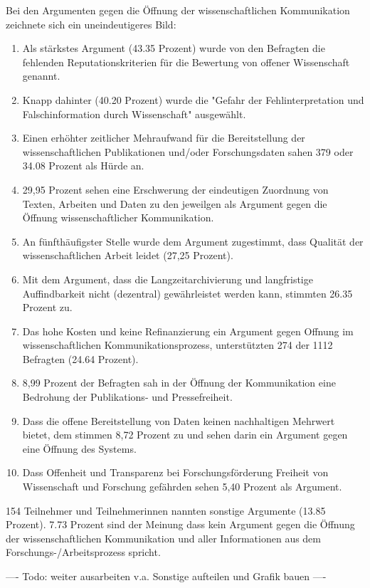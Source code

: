 Bei den Argumenten gegen die Öffnung der wissenschaftlichen Kommunikation zeichnete sich ein uneindeutigeres Bild:
\begin{enumerate}
\item Als stärkstes Argument (43.35 Prozent) wurde von den Befragten die fehlenden Reputationskriterien für die Bewertung von offener Wissenschaft genannt.   
\item Knapp dahinter (40.20 Prozent) wurde die "Gefahr der Fehlinterpretation und Falschinformation durch Wissenschaft" ausgewählt.
\item Einen erhöhter zeitlicher Mehraufwand für die Bereitstellung der wissenschaftlichen Publikationen und/oder Forschungsdaten sahen 379 oder 34.08 Prozent als Hürde an.
\item 29,95 Prozent sehen eine Erschwerung der eindeutigen Zuordnung von Texten, Arbeiten und Daten zu den jeweilgen als Argument gegen die Öffnung wissenschaftlicher Kommunikation.
\item  An fünfthäufigster Stelle wurde dem Argument zugestimmt, dass Qualität der wissenschaftlichen Arbeit leidet (27,25 Prozent).
\item Mit dem Argument, dass die Langzeitarchivierung und langfristige Auffindbarkeit nicht (dezentral) gewährleistet werden kann, stimmten 26.35 Prozent zu.
\item Das hohe Kosten und keine Refinanzierung ein Argument gegen Offnung im wissenschaftlichen Kommunikationsprozess, unterstützten 274 der 1112 Befragten (24.64 Prozent).
\item 8,99 Prozent der Befragten sah in der Öffnung der Kommunikation eine Bedrohung der Publikations- und Pressefreiheit.
\item Dass die offene Bereitstellung von Daten keinen nachhaltigen Mehrwert bietet, dem stimmen 8,72 Prozent zu und sehen darin ein Argument gegen eine Öffnung des Systems.
\item Dass Offenheit und Transparenz bei Forschungsförderung Freiheit von Wissenschaft und Forschung gefährden sehen 5,40 Prozent als Argument.  
\end{enumerate}

154 Teilnehmer und Teilnehmerinnen nannten sonstige Argumente (13.85 Prozent). 7.73 Prozent sind der Meinung dass kein Argument gegen die Öffnung der wissenschaftlichen Kommunikation und aller Informationen aus dem Forschungs-/Arbeitsprozess spricht.

---- Todo: weiter ausarbeiten v.a. Sonstige aufteilen und Grafik bauen ----

